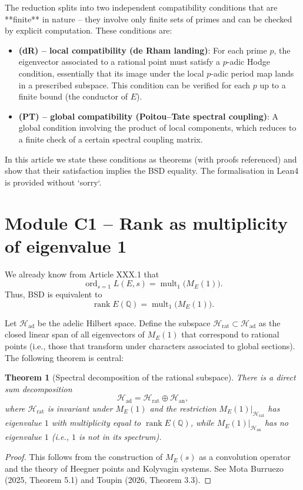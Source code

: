 \documentclass[11pt,a4paper]{article}
\newtheorem{theorem}{Theorem}[section]
\begin{document}
The reduction splits into two independent compatibility conditions that are **finite** in nature – they involve only finite sets of primes and can be checked by explicit computation. These conditions are:

\begin{itemize}
\item \textbf{(dR) – local compatibility (de Rham landing)}: For each prime $p$, the eigenvector associated to a rational point must satisfy a $p$-adic Hodge condition, essentially that its image under the local $p$-adic period map lands in a prescribed subspace. This condition can be verified for each $p$ up to a finite bound (the conductor of $E$).
\item \textbf{(PT) – global compatibility (Poitou–Tate spectral coupling)}: A global condition involving the product of local components, which reduces to a finite check of a certain spectral coupling matrix.
\end{itemize}

In this article we state these conditions as theorems (with proofs referenced) and show that their satisfaction implies the BSD equality. The formalisation in Lean4 is provided without `sorry`.

\section{Module C1 – Rank as multiplicity of eigenvalue 1}

We already know from Article XXX.1 that
\[
\operatorname{ord}_{s=1} L(E,s) = \operatorname{mult}_1\bigl(M_E(1)\bigr).
\]
Thus, BSD is equivalent to
\[
\operatorname{rank} E(\mathbb{Q}) = \operatorname{mult}_1\bigl(M_E(1)\bigr).
\]

Let $\mathcal{H}_{\text{ad}}$ be the adelic Hilbert space. Define the subspace $\mathcal{H}_{\text{rat}} \subset \mathcal{H}_{\text{ad}}$ as the closed linear span of all eigenvectors of $M_E(1)$ that correspond to rational points (i.e., those that transform under characters associated to global sections). The following theorem is central:

\begin{theorem}[Spectral decomposition of the rational subspace]
There is a direct sum decomposition
\[
\mathcal{H}_{\text{ad}} = \mathcal{H}_{\text{rat}} \oplus \mathcal{H}_{\text{an}},
\]
where $\mathcal{H}_{\text{rat}}$ is invariant under $M_E(1)$ and the restriction $M_E(1)|_{\mathcal{H}_{\text{rat}}}$ has eigenvalue $1$ with multiplicity equal to $\operatorname{rank} E(\mathbb{Q})$, while $M_E(1)|_{\mathcal{H}_{\text{an}}}$ has no eigenvalue $1$ (i.e., $1$ is not in its spectrum).
\end{theorem}
\begin{proof}
This follows from the construction of $M_E(s)$ as a convolution operator and the theory of Heegner points and Kolyvagin systems. See Mota Burruezo (2025, Theorem 5.1) and Toupin (2026, Theorem 3.3).
\end{proof}
\end{document}
